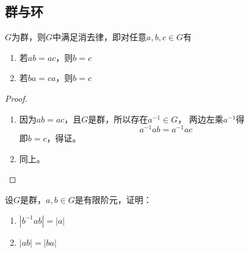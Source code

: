 \subsection{群与环}

\begin{theorem}

    $G$为群，则$G$中满足消去律，即对任意$a,b,c \in G$有
    \begin{enumerate}

        \item 若$ab = ac$，则$b = c$
        
        \item 若$ba = ca$，则$b = c$
        
    \end{enumerate}

\end{theorem}

\begin{proof}

    \begin{enumerate}

        \item 
            因为$ab = ac$，且$G$是群，所以存在$a^{-1} \in G$， 两边左乘$a^{-1}$得
            $$a^{-1} ab = a^{-1}ac$$
            即$b = c$，得证。

        \item 同上。
        
    \end{enumerate}

\end{proof}

\begin{proposition}

    设$G$是群，$a,b\in G$是有限阶元，证明：

    \begin{enumerate}

        \item $|b^{-1}ab| = |a|$
        
        \item $|ab| = |ba|$
        
    \end{enumerate}

\end{proposition}


